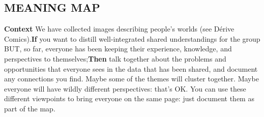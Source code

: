 \subsection*{MEANING MAP {\hfill\cognitive}}

\textbf{Context} We have collected images describing people’s worlds
(see {\sc Dérive Comics}).\newline \textbf{If} you want to distill
well-integrated shared understandings for the group BUT, so far,
everyone has been keeping their experience, knowledge, and
perspectives to themselves;\newline \textbf{Then} talk together about
the problems and opportunities that everyone sees in the data that has
been shared, and document any connections you find.  Maybe some of the
themes will cluster together.  Maybe everyone will have wildly
different perspectives: that’s OK.  You can use these different
viewpoints to bring everyone on the same page: just document them as
part of the map.
